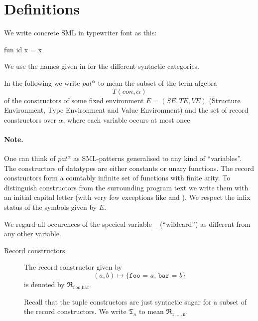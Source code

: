 \section{Definitions}
We write concrete SML in typewriter font as this:
\begin{sml}
fun id x = x
\end{sml}

We use the names given in \cite{SML97} for the different syntactic categories.

\begin{definition}
  In the following we write $pat^\alpha$ to mean the subset of the term algebra
  \[
  T(con, \alpha)
  \]
  of the constructors of some fixed environment $E = (S\!E, T\!E, V\!E)$
  (Structure Environment, Type Environment and Value Environment) and the set of
  record constructors over $\alpha$, where each variable occurs at most
  once. 

\end{definition}

\paragraph{Note.} One can think of $pat^\alpha$ as SML-patterns generalised to
any kind of ``variables''. The constructors of datatypes are either constants or
unary functions. The record constructors form a countably infinite set of
functions with finite arity. To distinguish constructors from the surrounding
program text we write them with an initial capital letter (with very few
exceptions like \codeinline{::} and ). We respect the infix
status of the symbols given by $E$.

We regard all occurences of the specieal variable \texttt{\_} (``wildcard'') as
different from any other variable.

\begin{description}
\item[Record constructors] The record constructor given by
  \[
  (a, b) \mapsto \texttt{\{foo = $a$, bar = $b$\}}
  \]
  is denoted by $\mathfrak{R}_{\texttt{foo},\texttt{bar}}$.

  Recall that the tuple constructors are just syntactic sugar for a subset of
  the record constructors. We write $\mathfrak{T}_n$ to mean
  $\mathfrak{R}_{\texttt{1},\ldots,\texttt{n}}$.
\end{description}

